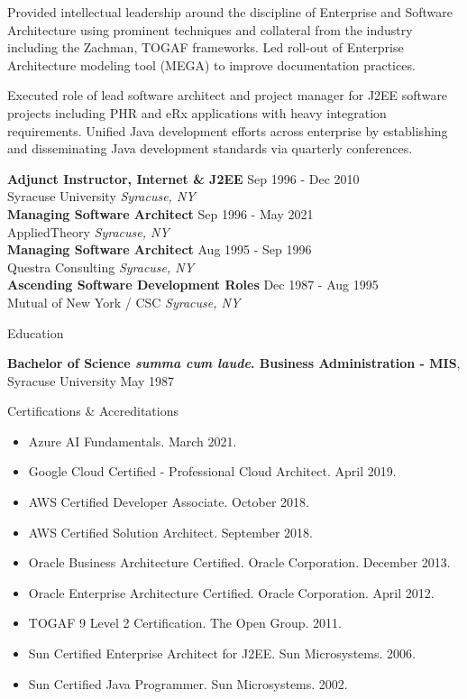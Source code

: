 \documentclass{resume} %
\begin{document}
Provided intellectual leadership around the discipline of Enterprise and Software Architecture using prominent techniques and collateral from the industry including the Zachman, TOGAF frameworks. Led roll-out of Enterprise Architecture modeling tool (MEGA) to improve documentation practices.  

Executed role of lead software architect and project manager for J2EE software projects including PHR and eRx applications with heavy integration requirements. Unified Java development efforts across enterprise by establishing and disseminating Java development standards via quarterly conferences.

\textbf{Adjunct Instructor, Internet \& J2EE} \hfill Sep 1996 - Dec 2010\\
Syracuse University \hfill \textit{Syracuse, NY}\\
\textbf{Managing Software Architect} \hfill Sep 1996 - May 2021\\
AppliedTheory \hfill \textit{Syracuse, NY}\\
\textbf{Managing Software Architect} \hfill Aug 1995 - Sep 1996\\
Questra Consulting \hfill \textit{Syracuse, NY}\\
\textbf{Ascending Software Development Roles} \hfill Dec 1987 - Aug 1995\\
Mutual of New York / CSC \hfill \textit{Syracuse, NY}\\

\pagebreak
\begin{rSection}{Education}

{\bf Bachelor of Science \emph{summa cum laude}. Business Administration - MIS}, Syracuse University \hfill {May 1987}\\
\end{rSection}

\begin{rSection}{Certifications \& Accreditations}
\begin{itemize}
   \item Azure AI Fundamentals. March 2021.
   \item Google Cloud Certified - Professional Cloud Architect. April 2019.
   \item AWS Certified Developer Associate. October 2018.
   \item AWS Certified Solution Architect. September 2018.
   \item Oracle Business Architecture Certified. Oracle Corporation. December 2013.
   \item Oracle Enterprise Architecture Certified. Oracle Corporation. April 2012.
   \item TOGAF 9 Level 2 Certification. The Open Group. 2011.
   \item Sun Certified Enterprise Architect for J2EE. Sun Microsystems. 2006.
   \item Sun Certified Java Programmer. Sun Microsystems. 2002.
\end{itemize}
\end{rSection}
\end{document}
